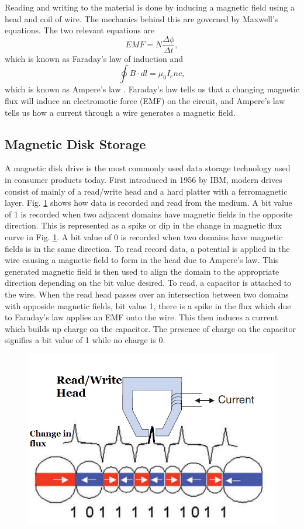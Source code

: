 \documentclass[ notitlepage, numerical, 11pt]{revtex4-1} %
\begin{document}
Reading and writing to the material is done by inducing a magnetic field using a head and coil of wire. The mechanics behind this are governed by Maxwell's equations. The two relevant equations are
\begin{equation}
EMF = N\frac{\Delta \phi}{\Delta t},
\label{faraday}
\end{equation}
which is known as Faraday's law of induction and 
\begin{equation}
\oint B\cdot dl = \mu_0 I_enc,
\label{ampere}
\end{equation}
which is known as Ampere's law \cite{purcell}. Faraday's law tells us that a changing magnetic flux will induce an electromotic force (EMF) on the circuit, and Ampere's law tells us how a current through a wire generates a magnetic field.

\subsection{Magnetic Disk Storage}
A magnetic disk drive is the most commonly used data storage technology used in consumer products today. First introduced in 1956 by IBM, modern drives consist of mainly of a read/write head and a hard platter with a ferromagnetic layer. Fig. \ref{basic} shows how data is recorded and read from the medium. A bit value of 1 is recorded when two adjacent domains have magnetic fields in the opposite direction. This is represented as a spike or dip in the change in magnetic flux curve in Fig. \ref{basic}. A bit value of 0 is recorded when two domains have magnetic fields is in the same direction. To read record data, a potential is applied in the wire causing a magnetic field to form in the head due to Ampere's law. This generated magnetic field is then used to align the domain to the appropriate direction depending on the bit value desired. To read, a capacitor is attached to the wire. When the read head passes over an intersection between two domains with opposide magnetic fields, bit value 1, there is a spike in the flux which due to Faraday's law applies an EMF onto the wire. This then induces a current which builds up charge on the capacitor. The presence of charge on the capacitor signifies a bit value of 1 while no charge is 0.
\begin{figure}[H]
\centerline{\includegraphics[scale=.45]{basic.png}}
\caption{}
\label{basic}
\end{figure}
\end{document}
